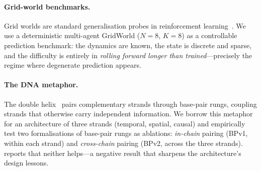 \paragraph{Grid-world benchmarks.}
Grid worlds are standard generalisation probes in reinforcement
learning~\cite{gridworld}. We use a deterministic multi-agent GridWorld
($N{=}8$, $K{=}8$) as a controllable prediction benchmark: the dynamics are
known, the state is discrete and sparse, and the difficulty is entirely in
\emph{rolling forward longer than trained}---precisely the regime where
degenerate prediction appears.

\paragraph{The DNA metaphor.}
The double helix~\cite{watson1953molecular} pairs complementary strands through
base-pair rungs, coupling strands that otherwise carry independent information.
We borrow this metaphor for an architecture of three strands (temporal, spatial,
causal) and empirically test two formalisations of base-pair rungs as
ablations: \emph{in-chain} pairing (BPv1, within each strand) and
\emph{cross-chain} pairing (BPv2, across the three strands).
 reports that neither helps---a negative result that
sharpens the architecture's design lessons.
